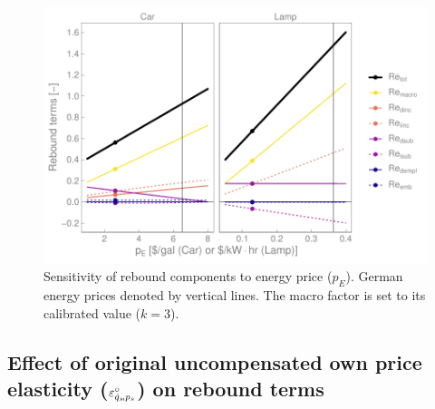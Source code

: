 \documentclass[12pt]{article}\usepackage[]{graphicx}\usepackage[]{xcolor}
\makeatletter
\def\maxwidth{ %
  \ifdim\Gin@nat@width>\linewidth
    \linewidth
  \else
    \Gin@nat@width
  \fi
}
\newenvironment{knitrout}{}{} %
\makeatother
\begin{document}
\begin{knitrout}
\color{fgcolor}\begin{figure}

{\centering \includegraphics[width=\maxwidth]{figure/all_Re_terms_p_E_graph-1} 

}

\caption[Sensitivity of rebound components to energy price ($p_E$)]{Sensitivity of rebound components to energy price ($p_E$). German energy prices denoted by vertical lines. The macro factor is set to its calibrated value ($k = 3$).}\label{fig:all_Re_terms_p_E_graph}
\end{figure}

\end{knitrout}
  
  
\subsection{Effect of original uncompensated own price elasticity ($\varepsilon_{\dot{q}_s\!,p_s}^\circ$) on rebound terms} 
\label{sec:effect_of_elasticity}
\end{document}
